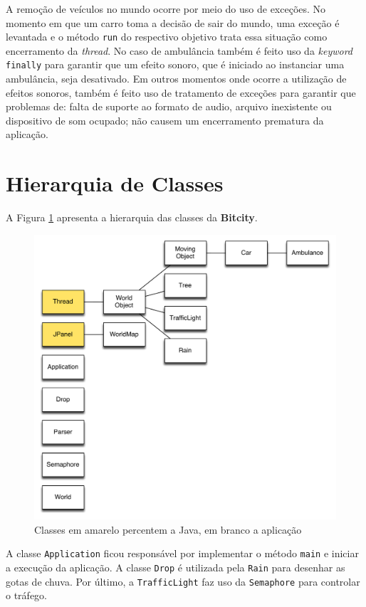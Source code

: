 A remoção de veículos no mundo ocorre por meio do uso de exceções. No
momento em que um carro toma a decisão de sair do mundo, uma exceção é
levantada e o método \verb!run! do respectivo objetivo trata essa
situação como encerramento da \textit{thread}. No caso de ambulância
também é feito uso da \textit{keyword} \verb!finally! para garantir
que um efeito sonoro, que é iniciado ao instanciar uma ambulância,
seja desativado. Em outros momentos onde ocorre a utilização de
efeitos sonoros, também é feito uso de tratamento de exceções para
garantir que problemas de: falta de suporte ao formato de audio,
arquivo inexistente ou dispositivo de som ocupado; não causem um
encerramento prematura da aplicação.

\section{Hierarquia de Classes}

A Figura \ref{hierarchy} apresenta a hierarquia das classes da
\textbf{Bitcity}.

\begin{figure}[ht!]
  \centering
  \includegraphics[scale=0.58]{figs/hierarchy}
  \caption{Classes em amarelo percentem a Java, em branco a aplicação \label{hierarchy}}
\end{figure}

A classe \verb!Application! ficou responsável por implementar o método
\verb!main! e iniciar a execução da aplicação. A classe \verb!Drop! é
utilizada pela \verb!Rain! para desenhar as gotas de chuva. Por
último, a \verb!TrafficLight! faz uso da \verb!Semaphore! para
controlar o tráfego.
